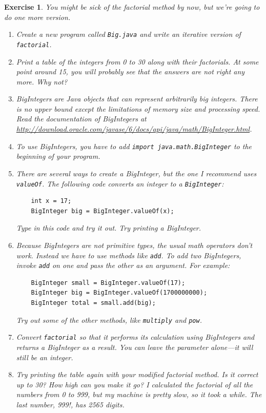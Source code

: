 \documentclass[12pt]{book}
\theoremstyle{exercise}
\newtheorem{exercise}{Exercise}[chapter]
\begin{document}
\begin{exercise}
\label{ex.biginteger}
You might be sick of the factorial
method by now, but we're going to do one more version.

\begin{enumerate}

\item Create a new program called {\tt Big.java} and
write an iterative version of {\tt factorial}.

\item Print a table of the integers from 0 to 30 along with their
factorials.  At some point around 15, you will probably see
that the answers are not right any more.  Why not?

\item BigIntegers are Java objects that can represent arbitrarily big
  integers.  There is no upper bound except the limitations of memory
  size and processing speed.  Read the documentation of BigIntegers at
  \url{http://download.oracle.com/javase/6/docs/api/java/math/BigInteger.html}.

\item To use BigIntegers, you have to add {\tt import
java.math.BigInteger} to the beginning of your program.

\item There are several ways to create a
BigInteger, but the one I recommend uses {\tt valueOf}.
The following code converts an integer to a {\tt BigInteger}:

\begin{lstlisting}
    int x = 17;
    BigInteger big = BigInteger.valueOf(x);
\end{lstlisting}

Type in this code and try it out.  Try printing a BigInteger.

\item Because BigIntegers are not primitive types,
the usual math operators don't work.  Instead we
have to use methods like {\tt add}.  To
add two BigIntegers, invoke {\tt add} on one
and pass the other as an argument.  For example:

\begin{lstlisting}
    BigInteger small = BigInteger.valueOf(17);
    BigInteger big = BigInteger.valueOf(1700000000);
    BigInteger total = small.add(big);
\end{lstlisting}

Try out some of the other methods, like {\tt multiply} and
{\tt pow}.

\item Convert {\tt factorial} so that it performs its calculation
using BigIntegers and returns a BigInteger as a result.
You can leave the parameter alone---it will still be an integer.

\item Try printing the table again with your modified factorial
method.  Is it correct up to 30?  How high can you make it go?  I
calculated the factorial of all the numbers from 0 to 999, but my
machine is pretty slow, so it took a while.  The last number, 999!,
has 2565 digits.

\end{enumerate}
\end{exercise}
\end{document}
